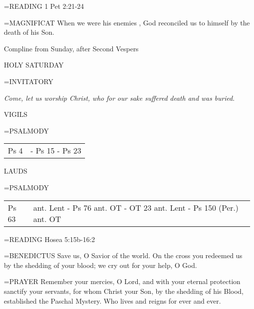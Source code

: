 \hangindent=\parindent \small{READING}    1 Pet 2:21-24 \textbf{   \\}

\hangindent=\parindent \small{MAGNIFICAT 	When we were his enemies , God reconciled us to himself by the death of his Son.\\}

Compline from Sunday, after Second Vespers

\begin{center}
\normalsize HOLY SATURDAY
\end{center}

\hangindent=\parindent \small{INVITATORY}
\begin{center}
\textit{Come, let us worship Christ, who for our sake suffered death and was buried.\\}
\end{center}

\begin{flushleft}\normalsize VIGILS\\\end{flushleft}
\hangindent=\parindent \small{PSALMODY}
\begin{center}
\begin{tabular}{ l l }
Ps 4 &  - Ps 15 - Ps 23\\
\end{tabular}
\end{center}		

\begin{flushleft}\normalsize LAUDS\\\end{flushleft}
\hangindent=\parindent \small{PSALMODY}
\begin{center}
\begin{tabular}{ l l }
Ps 63 &  ant. Lent - Ps 76 ant. OT - OT 23 ant. Lent - Ps 150 (Per.) ant. OT\\
\end{tabular}
\end{center}		

\hangindent=\parindent \small{READING}    Hosea 5:15b-16:2 \textbf{   \\}

\hangindent=\parindent \small{BENEDICTUS 	Save us, O Savior of the world. On the cross you redeemed us by the shedding of your blood; we cry out for your help, O God.\\}

\hangindent=\parindent \small{PRAYER 	Remember your mercies, O Lord, and with your eternal protection sanctify your servants, for whom Christ your Son, by the shedding of his Blood, established the Paschal Mystery. Who lives and reigns for ever and ever.}

